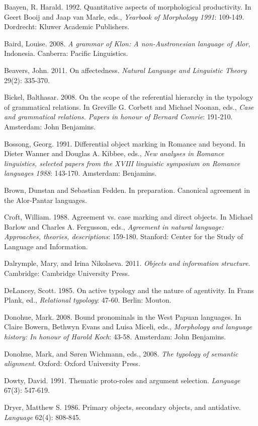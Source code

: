 Baayen, R. Harald. 1992. Quantitative aspects of morphological productivity. In Geert Booij and Jaap van Marle, eds., \textit{Yearbook of Morphology 1991}: 109{}-149. Dordrecht: Kluwer Academic Publishers.

Baird, Louise. 2008. \textit{A grammar of Klon: A non-Austronesian language of Alor}, Indonesia. Canberra: Pacific Linguistics. 

Beavers, John. 2011. On affectedness. \textit{Natural Language and Linguistic Theory} 29(2): 335-370.

Bickel, Balthasar. 2008. On the scope of the referential hierarchy in the typology of grammatical relations. In Greville G. Corbett and Michael Noonan, eds., \textit{Case and grammatical relations. Papers in honour of Bernard Comrie}: 191{}-210. Amsterdam: John Benjamins.

Bossong, Georg. 1991. Differential object marking in Romance and beyond. In Dieter Wanner and Douglas A. Kibbee, eds., \textit{New analyses in Romance linguistics, selected papers from the XVIII linguistic symposium on Romance languages 1988}: 143-170. Amsterdam: Benjamins.

Brown, Dunstan and Sebastian Fedden. In preparation. Canonical agreement in the Alor-Pantar languages.

Croft, William. 1988. Agreement vs. case marking and direct objects. In Michael Barlow and Charles A. Fergusson, eds., \textit{Agreement in natural language: Approaches, theories, descriptions}: 159-180. Stanford: Center for the Study of Language and Information.

Dalrymple, Mary, and Irina Nikolaeva. 2011. \textit{Objects and information structure}. Cambridge: Cambridge University Press.

DeLancey, Scott. 1985. On active typology and the nature of agentivity. In Frans Plank, ed., \textit{Relational typology}: 47{}-60. Berlin: Mouton.

Donohue, Mark. 2008. Bound pronominals in the West Papuan languages. In Claire Bowern, Bethwyn Evans and Luisa Miceli, eds., \textit{Morphology and language history: In honour of Harold Koch}: 43{}-58. Amsterdam: John Benjamins.

Donohue, Mark, and S{\o}ren Wichmann, eds., 2008. \textit{The typology of semantic alignment}. Oxford: Oxford University Press.

Dowty, David. 1991. Thematic proto-roles and argument selection. \textit{Language }67(3): 547{}-619.

Dryer, Matthew S. 1986. Primary objects, secondary objects, and antidative. \textit{Language} 62(4): 808{}-845.

